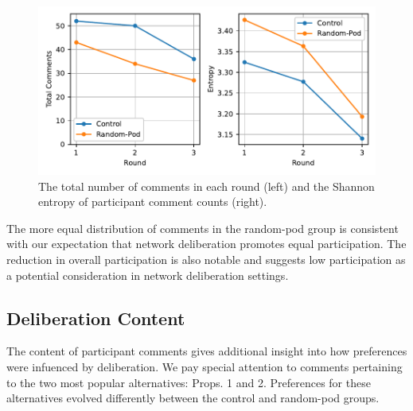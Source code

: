 {\begin{figure}
    \centering
    \includegraphics[width=6in]{chapters/figures/NetDelibExp/fig-comment-rounds.pdf}
    \caption{The total number of comments in each round (left) and the Shannon entropy of participant comment counts (right).}
    \label{fig:commentrounds}
\end{figure}

The more equal distribution of comments in the random-pod group is consistent with our expectation that network deliberation promotes equal participation.
The reduction in overall participation is also notable and suggests low participation as a potential consideration in network deliberation settings.


\subsection{Deliberation Content}
\label{sec:res-content}

The content of participant comments gives additional insight into how preferences were infuenced by deliberation.
We pay special attention to comments pertaining to the two most popular alternatives: Props. 1 and 2.
Preferences for these alternatives evolved differently between the control and random-pod groups.

}
